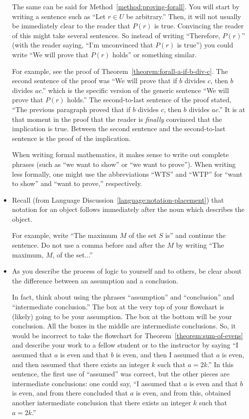 \documentclass{book}
\theoremstyle{ekimcustom}
\begin{document}
\begin{itemize}
The same can be said for Method~\ref{method:proving-forall}. You will start by writing a sentence such as ``Let $r \in U$ be arbitrary.'' Then, it will not usually be immediately clear to the reader that $P(r)$ is true. Convincing the reader of this might take several sentences. So instead of writing ``Therefore, $P(r)$'' (with the reader saying, ``I'm unconvinced that $P(r)$ is true'') you could write ``We will prove that $P(r)$ holds'' or something similar.

For example, see the proof of Theorem~\ref{theorem:forall-a-if-b-div-c}. The second sentence of the proof was ``We will prove that if $b$ divides $c$, then $b$ divides $ac$.'' which is the specific version of the generic sentence ``We will prove that $P(r)$ holds.'' The second-to-last sentence of the proof stated, ``The previous paragraph proved that if $b$ divides $c$, then $b$ divides $ac$.'' It is at that moment in the proof that the reader is \emph{finally} convinced that the implication is true. Between the second sentence and the second-to-last sentence is the proof of the implication.

When writing formal mathematics, it makes sense to write out complete phrases (such as ``we want to show'' or ``we want to prove''). When writing less formally, one might use the abbreviations ``WTS'' and ``WTP'' for ``want to show'' and ``want to prove,'' respectively.

\item Recall (from Language Discussion~\ref{language:notation-placement}) that notation for an object follows immediately after the noun which describes the object.

For example, write ``The maximum $M$ of the set $S$ is'' and continue the sentence. Do not use a comma before and after the $M$ by writing ``The maximum, $M$, of the set...''


\item As you describe the process of logic to yourself and to others, be clear about the difference between an assumption and a conclusion.

In fact, think about using the phrases ``assumption'' and ``conclusion'' and ``intermediate conclusion.'' The box at the very top of your flowchart is (likely) going to be your assumption. The box at the bottom will be your conclusion. All the boxes in the middle are intermediate conclusions. So, it would be incorrect to take the flowchart for Theorem~\ref{theorem:sum-of-evens} and describe your work to a fellow student or to the instructor by saying ``I assumed that $a$ is even and that $b$ is even, and then I assumed that $a$ is even, and then assumed that there exists an integer $k$ such that $a=2k$.'' In this sentence, the first use of ``assumed'' was correct, but the other pieces are intermediate conclusions: one could say, ``I assumed that $a$ is even and that $b$ is even, and from there concluded that $a$ is even, and from this, obtained another intermediate conclusion that there exists an integer $k$ such that $a=2k$.''


\end{itemize}
\end{document}
